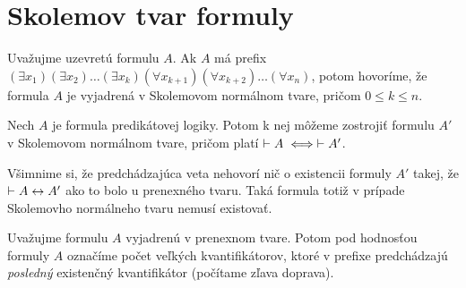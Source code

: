 \section{Skolemov tvar formuly}

\begin{definicia}
  Uvažujme uzevretú formulu $A$.
  Ak $A$ má prefix $(\exists x_1)(\exists x_2) \dots (\exists x_k)
    (\forall x_{k+1}) (\forall x_{k+2}) \dots (\forall x_n)$, potom 
    hovoríme, že formula $A$ je vyjadrená v Skolemovom normálnom
    tvare, pričom $0 \le k \le n$.
\end{definicia}

\begin{veta}
    Nech $A$ je formula predikátovej logiky. Potom k nej môžeme
    zostrojiť formulu $A'$ v Skolemovom normálnom tvare, pričom platí
    $\vdash A \iff \vdash A'$.
    \label{veta:skolem}
\end{veta}

\begin{poznamka}
    Všimnime si, že predchádzajúca veta nehovorí nič o existencii
    formuly $A'$ takej, že $\vdash A \leftrightarrow A'$ ako to
    bolo u prenexného tvaru. Taká formula totiž v prípade Skolemovho
    normálneho tvaru nemusí existovať.
\end{poznamka}

\begin{definicia}
    Uvažujme formulu $A$ vyjadrenú v prenexnom tvare. Potom pod
    hodnosťou formuly $A$ označíme počet veľkých kvantifikátorov,
    ktoré v prefixe predchádzajú \emph{posledný} existenčný
    kvantifikátor (počítame zľava doprava).
\end{definicia}
\begin{priklad}
\end{priklad}

\def\existsxton{(\exists x_1) (\exists x_2) \dots (\exists x_n)}
\def\forallxton{(\forall x_1) (\forall x_2) \dots (\forall x_n)}

